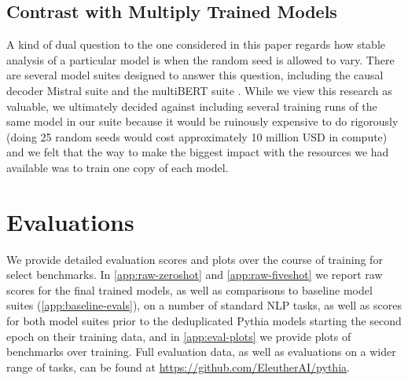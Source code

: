\documentclass{article}
\theoremstyle{plain}
\theoremstyle{definition}
\theoremstyle{remark}
\begin{document}
\subsection{Contrast with Multiply Trained Models}

A kind of dual question to the one considered in this paper regards how stable analysis of a particular model is when the random seed is allowed to vary. There are several model suites designed to answer this question, including the causal decoder Mistral suite \citep{karamcheti2021mistral} and the multiBERT suite \citep{sellam2021multiberts}. While we view this research as valuable, we ultimately decided against including several training runs of the same model in our suite because it would be ruinously expensive to do rigorously (doing 25 random seeds would cost approximately 10 million USD in compute) and we felt that the way to make the biggest impact with the resources we had available was to train one copy of each model.

\clearpage
\section{Evaluations}\label{app:evals}

We provide detailed evaluation scores and plots over the course of training for select benchmarks. In \cref{app:raw-zeroshot} and \cref{app:raw-fiveshot} we report raw scores for the final trained models, as well as comparisons to baseline model suites (\cref{app:baseline-evals}), on a number of standard NLP tasks, as well as scores for both model suites prior to the deduplicated Pythia models starting the second epoch on their training data, and in \cref{app:eval-plots} we provide plots of benchmarks over training. Full evaluation data, as well as evaluations on a wider range of tasks, can be found at \href{https://github.com/EleutherAI/pythia}{https://github.com/EleutherAI/pythia}.
\end{document}
